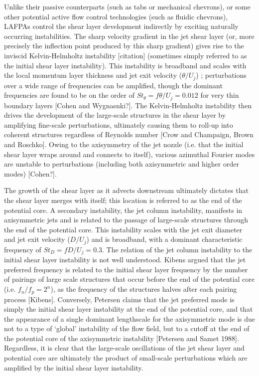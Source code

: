 Unlike their passive counterparts (such as tabs or mechanical chevrons), or some other potential active flow control technologies (such as fluidic chevrons), LAFPAs control the shear layer development indirectly by exciting naturally occurring instabilities.
The sharp velocity gradient in the jet shear layer (or, more precisely the inflection point produced by this sharp gradient) gives rise to the inviscid Kelvin-Helmholtz instability [citation] (sometimes simply referred to as the initial shear layer instability).
This instability is broadband and scales with the local momentum layer thickness and jet exit velocity ($\theta / U_j$) ; perturbations over a wide range of frequencies can be amplified, though the dominant frequencies are found to be on the order of $St_{\theta} = f \theta /U_j = 0.012$ for very thin boundary layers [Cohen and Wygnasnki?]. 
The Kelvin-Helmholtz instability then drives the development of the large-scale structures in the shear layer by amplifying fine-scale perturbations, ultimately causing them to roll-up into coherent structures regardless of Reynolds number [Crow and Champaign, Brown and Roschko].
Owing to the axisymmetry of the jet nozzle (i.e. that the initial shear layer wraps around and connects to itself), various azimuthal Fourier modes are unstable to perturbations (including both axisymmetric and higher order modes) [Cohen?].

The growth of the shear layer as it advects downstream ultimately dictates that the shear layer merges with itself; this location is referred to as the end of the potential core.
A secondary instability, the jet column instability, manifests in axisymmetric jets and is related to the passage of large-scale structures through the end of the potential core.
This instability scales with the jet exit diameter and jet exit velocity ($D / U_j$) and is broadband, with a dominant characteristic frequency of $St_{D} = f D /U_j = 0.3$.
The relation of the jet column instability to the initial shear layer instability is not well understood.  
Kibens argued that the jet preferred frequency is related to the initial shear layer frequency by the number of pairings of large scale structures that occur before the end of the potential core (i.e. $f_n / f_p = 2^n$), as the frequency of the structures halves after each pairing process [Kibens].  
Conversely, Petersen claims that the jet preferred mode is simply the initial shear layer instability at the end of the potential core, and that the appearance of a single dominant lengthscale for the axisymmetric mode is due not to a type of `global' instability of the flow field, but to a cutoff at the end of the potential core of the axisymmetric instability [Petersen and Samet 1988].
Regardless, it is clear that the large-scale oscillations of the jet shear layer and potential core are ultimately the product of small-scale perturbations which are amplified by the initial shear layer instability.

